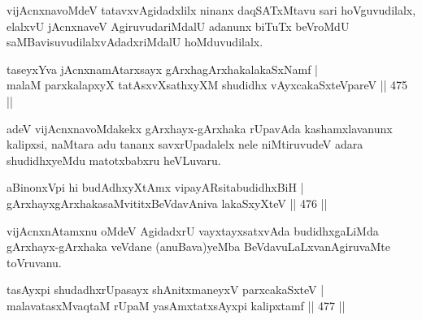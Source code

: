 \begin{artha}
vijAcnxnavoMdeV tatavxvAgidadxlilx ninanx daqSATxMtavu sari hoVguvudilalx, elalxvU jAcnxnaveV AgiruvudariMdalU adanunx biTuTx beVroMdU saMBavisuvudilalxvAdadxriMdalU hoMduvudilalx.
\end{artha}

\begin{shl}
taseyxYva jAcnxnamAtarxsayx gArxhagArxhakalakaSxNamf | \\
malaM parxkalapxyX tatAsxvXsathxyXM shudidhx vAyxcakaSxteV\s pareV \hfill||  475 ||  
\end{shl}

\begin{artha}
adeV vijAcnxnavoMdakekx gArxhayx-gArxhaka rUpavAda kashamxlavanunx kalipxsi, naMtara adu tananx savxrUpadalelx nele niMtiruvudeV adara shudidhxyeMdu matotxbabxru heVLuvaru.
\end{artha}

\begin{shl}
aBinonxV\s pi hi budAdhxyXtAmx vipayARsitabudidhxBiH | \\
gArxhayxgArxhakasaMvititxBeVdavAniva lakaSxyXteV \hfill||  476 ||  
\end{shl}

\begin{artha}
vijAcnxnAtamxnu oMdeV AgidadxrU vayxtayxsatxvAda budidhxgaLiMda gArxhayx-gArxhaka veVdane (anuBava)yeMba BeVdavuLaLxvanAgiruvaMte toVruvanu.
\end{artha}


\begin{shl}
tasAyxpi shudadhxrUpasayx shAnitxmaneyxV parxcakaSxteV | \\
\footnotemark[1]malavatasxMvaqtaM rUpaM yasAmxtatxsAyxpi kalipxtamf \hfill||  477 ||  
\end{shl}

